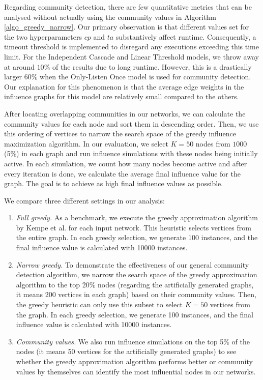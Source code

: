 \documentclass[pdflatex,sn-mathphys-ay]{sn-jnl}
\begin{document}
Regarding community detection, there are few quantitative metrics that can be analysed without actually using the community values in Algorithm \ref{algo_greedy_narrow}. Our primary observation is that different values set for the two hyperparameters $cp$ and $ta$ substantively affect runtime. Consequently, a timeout threshold is implemented to disregard any executions exceeding this time limit. For the Independent Cascade and Linear Threshold models, we throw away at around $10\%$ of the results due to long runtime. However, this is a drastically larger $60\%$ when the Only-Listen Once model is used for community detection. Our explanation for this phenomenon is that the average edge weights in the influence graphs for this model are relatively small compared to the others.

After locating overlapping communities in our networks, we can calculate the community values for each node and sort them in descending order. Then, we use this ordering of vertices to narrow the search space of the greedy influence maximization algorithm. In our evaluation, we select $K = 50$ nodes from $1000$ (5\%) in each graph and run influence simulations with these nodes being initially active. In each simulation, we count how many nodes become active and after every iteration is done, we calculate the average final influence value for the graph. The goal is to achieve as high final influence values as possible.

We compare three different settings in our analysis:

\begin{enumerate}
\setlength\itemsep{0.5em}
\item \textit{Full greedy.} As a benchmark, we execute the greedy approximation algorithm by Kempe et al. for each input network. This heuristic selects vertices from the entire graph. In each greedy selection, we generate 100 instances, and the final influence value is calculated with 10000 instances.
\item \textit{Narrow greedy.} To demonstrate the effectiveness of our general community detection algorithm, we narrow the search space of the greedy approximation algorithm to the top 20\% nodes (regarding the artificially generated graphs, it means $200$ vertices in each graph) based on their community values. Then, the greedy heuristic can only use this subset to select $K = 50$ vertices from the graph. In each greedy selection, we generate 100 instances, and the final influence value is calculated with 10000 instances.
\item \textit{Community values.} We also run influence simulations on the top 5\% of the nodes (it means 50 vertices for the artificially generated graphs) to see whether the greedy approximation algorithm performs better or community values by themselves can identify the most influential nodes in our networks.
\end{enumerate}
\end{document}
